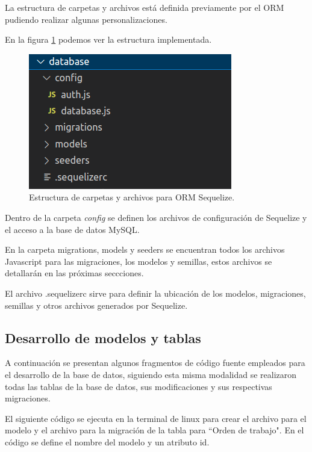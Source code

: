 La estructura de carpetas y archivos está definida previamente por el ORM pudiendo realizar algunas personalizaciones. 

En la figura \ref{fig:estructuraorm} podemos ver la estructura implementada.

\begin{figure}[h]
	\centering
	\includegraphics[scale=.50]{./Figures/estructuraorm.png}
	\caption{Estructura de carpetas y archivos para ORM Sequelize.}
	\label{fig:estructuraorm}
\end{figure}

Dentro de la carpeta \textit{config} se definen los archivos de configuración de Sequelize y el acceso a la base de datos MySQL.

En la carpeta migrations, models y seeders se encuentran todos los archivos Javascript para las migraciones, los modelos y semillas, estos archivos se detallarán en las próximas seccciones. 

El archivo .sequelizerc sirve para definir la ubicación de los modelos, migraciones, semillas y otros archivos generados por Sequelize.


\subsection{Desarrollo de modelos y tablas}
\label{subsec:modelobasededatos}



A continuación se presentan algunos fragmentos de código fuente empleados para el desarrollo de la base de datos, siguiendo esta misma modalidad se realizaron todas las tablas de la base de datos, sus modificaciones y sus respectivas migraciones.


El siguiente código se ejecuta en la terminal de linux para crear el archivo para el modelo y el archivo para la migración de la tabla para ``Orden de trabajo". En el código se define el nombre del modelo y un atributo id. 

